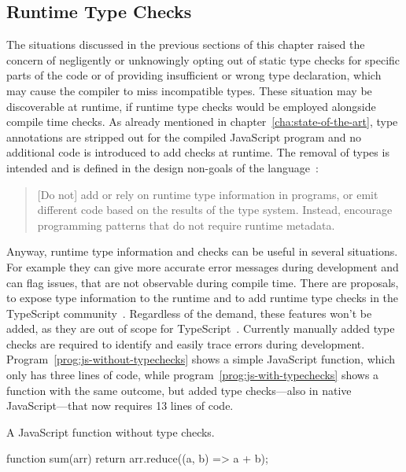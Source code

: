 \subsection{Runtime Type Checks}
\label{sec:runtime-type-checks}

The situations discussed in the previous sections of this chapter raised the concern of negligently or unknowingly opting out of static type checks for specific parts of the code or of providing insufficient or wrong type declaration, which may cause the compiler to miss incompatible types. These situation may be discoverable at runtime, if runtime type checks would be employed alongside compile time checks. As already mentioned in chapter~\ref{cha:state-of-the-art}, type annotations are stripped out for the compiled JavaScript program and no additional code is introduced to add checks at runtime. The removal of types is intended and is defined in the design non-goals of the language~\cite{TypeScriptWiki:DesignGoals}:
\begin{quote}
  [Do not] add or rely on runtime type information in programs,
  or emit different code based on the results of the type system.
  Instead, encourage programming patterns that do not require runtime metadata.
\end{quote}
Anyway, runtime type information and checks can be useful in several situations. 
For example they can give more accurate error messages during development and can 
flag issues, that are not observable during compile time.
There are proposals, to expose type information to the runtime and to add runtime type
checks in the TypeScript community~\cites{TypeScriptIssue:RuntimeTypeChecking, TypeScriptIssue:RuntimeTypeChecks, TypeScriptIssue:EmitTypeArguments}. Regardless of the demand, these features won't be added, as they are out of scope
for TypeScript~\cite{TypeScriptIssue:RuntimeTypeChecking:Comment:OutOfScope, TypeScriptIssue:EmitTypeArguments:Comment:OutOfScope}.
Currently manually added type checks are required to identify and easily trace errors during development. Program~\ref{prog:js-without-typechecks} shows a simple JavaScript function, which only has three lines of code, while program~\ref{prog:js-with-typechecks} shows a function with the same outcome, but added type 
checks---also in native JavaScript---that now requires 13 lines of code.
\begin{program}
\caption{A JavaScript function without type checks.}
\label{prog:js-without-typechecks}
\begin{JsCode}
function sum(arr) {
  return arr.reduce((a, b) =>  a + b);
}
\end{JsCode}
\end{program}
